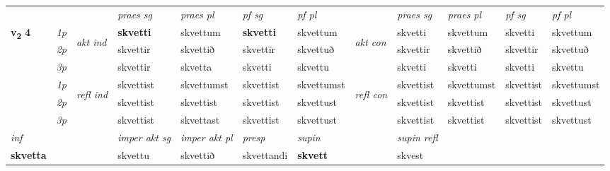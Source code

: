 \begin{longtable}[l]{X>{\footnotesize\itshape}llXXXXlXXXX}
\midrule

 & &   & \textit{praes sg}  & \textit{praes pl}    & \textit{ pf sg} & \textit{pf pl} & & \textit{praes sg}  & \textit{praes pl}    & \textit{pf sg} & \textit{pf pl }  \\ \cmidrule{4-7} \cmidrule{9-12}
 \multirow{2}{*}{{{\textbf{v{\textsubscript{2}}} \Large{\textbf{4}}}}}  & 1p & \multirow{3}{*}{\begin{turn}{90}\textit{akt ind}\end{turn}} & \textbf{skvetti} & skvettum & \textbf{skvetti} & skvettum & \multirow{3}{*}{\begin{turn}{90}\textit{akt con}\end{turn}} &skvetti & skvettum & skvetti & skvettum\\*
 & 2p &  &  skvettir  & skvettið & skvettir & skvettuð & & skvettir & skvettið & skvettir & skvettuð \\*
 & 3p &  & skvettir & skvetta & skvetti & skvettu & & skvetti & skvetti& skvetti & skvettu \\*
\cmidrule{4-7} \cmidrule{9-12}
 & 1p & \multirow{3}{*}{\begin{turn}{90}\textit{refl ind}\end{turn}}  & skvettist & skvettumst & skvettist & skvettumst & \multirow{3}{*}{\begin{turn}{90}\textit{refl con}\end{turn}}  &skvettist & skvettumst & skvettist & skvettumst \\*
 & 2p &  & skvettist & skvettist & skvettist & skvettust & &skvettist & skvettist & skvettist & skvettust \\*
 & 3p  & & skvettist & skvettast & skvettist & skvettust & & skvettist & skvettist& skvettist & skvettust \\*
\cmidrule{4-7} \cmidrule{9-12}

   {\textit{inf}} & &  & \textit{imper akt sg} & \textit{imper akt pl}   & \textit{presp} & \textit{supin} && \textit{supin refl}  \\*
  {\textbf{skvetta}} & && skvettu  & skvettið   & skvettandi &  \textbf{skvett} && skvest  \\*


\end{longtable}
